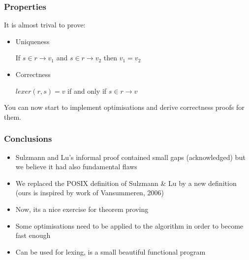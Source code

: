 \documentclass{beamer}
\begin{document}
	\begin{frame}[c]
	\frametitle{Properties}
	
	It is almost trival to prove:
	
	\begin{itemize}
	\item Uniqueness
	\begin{center}
	If $s \in r \to v_1$ and $s \in r \to v_2$ then
	$v_1 = v_2$
	\end{center}\bigskip
	
	\item Correctness
	\begin{center}
	$lexer(r, s) = v$ if and only if $s \in r \to v$
	\end{center}
	\end{itemize}\bigskip\bigskip\pause
	
	
	You can now start to implement optimisations and derive
	correctness proofs for them.%
%	
%	
	\end{frame}
	
		
		\begin{frame}
			\frametitle{Conclusions}
			
			\begin{itemize}
				
				\item Sulzmann and Lu's informal proof contained small gaps (acknowledged) but we believe it had
				also fundamental flaws\medskip
				
				\item We replaced the POSIX definition of Sulzmann \& Lu by a
				new definition (ours is inspired by work of Vansummeren,
				2006)\medskip
				
				\item Now, its a nice exercise for theorem proving\medskip
				
				\item Some optimisations need to be applied to the algorithm
				in order to become fast enough\medskip
				
				\item Can be used for lexing, is a small beautiful functional
				program
				
			\end{itemize}
		\end{frame}
		
	
\end{document}
